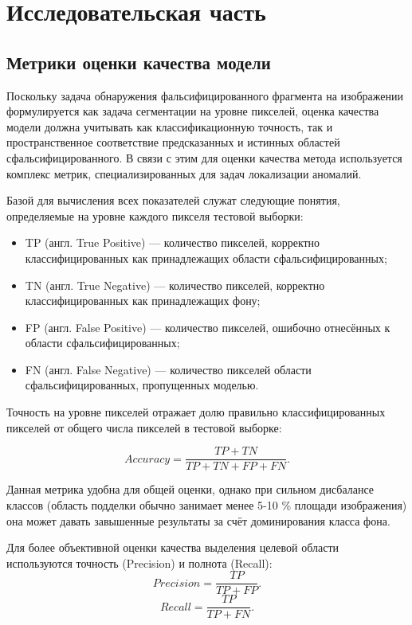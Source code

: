 \chapter{Исследовательская часть}

\section{Метрики оценки качества модели}

Поскольку задача обнаружения фальсифицированного фрагмента на изображении формулируется как задача сегментации на уровне пикселей, оценка качества модели должна учитывать как классификационную точность, так и пространственное соответствие предсказанных и истинных областей сфальсифицированного. В связи с этим для оценки качества метода используется комплекс метрик, специализированных для задач локализации аномалий.

Базой для вычисления всех показателей служат следующие понятия, определяемые на уровне каждого пикселя тестовой выборки:
\begin{itemize}[label = ---]
    \item TP (англ. True Positive) --- количество пикселей, корректно классифицированных как принадлежащих области сфальсифицированных;
    \item TN (англ. True Negative) --- количество пикселей, корректно классифицированных как принадлежащих фону;
    \item FP (англ. False Positive) --- количество пикселей, ошибочно отнесённых к области сфальсифицированных;
    \item FN (англ. False Negative) --- количество пикселей области сфальсифицированных, пропущенных моделью.
\end{itemize}

Точность на уровне пикселей отражает долю правильно классифицированных пикселей от общего числа пикселей в тестовой выборке:

\begin{equation}
    Accuracy = \frac{TP + TN}{TP + TN + FP + FN}.
\end{equation}

Данная метрика удобна для общей оценки, однако при сильном дисбалансе классов (область подделки обычно занимает менее 5-10 \% площади изображения) она может давать завышенные результаты за счёт доминирования класса фона.

Для более объективной оценки качества выделения целевой области используются точность (Precision) и полнота (Recall):
\begin{equation}
    Precision = \frac{TP}{TP + FP}.
\end{equation}
\begin{equation}
    Recall = \frac{TP}{TP + FN}.
\end{equation}

